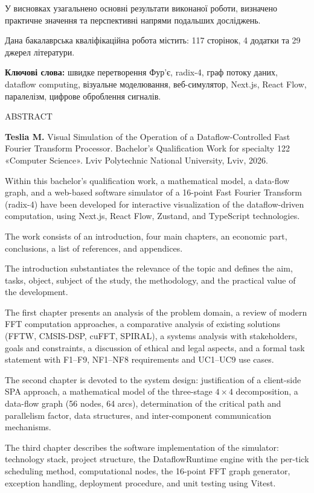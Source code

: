 \documentclass[
]{article}
\begin{document}
У висновках узагальнено основні результати виконаної роботи, визначено
практичне значення та перспективні напрями подальших досліджень.

Дана бакалаврська кваліфікаційна робота містить: 117 сторінок, 4 додатки
та 29 джерел літератури.

\textbf{Ключові слова:} швидке перетворення Фур'є, radix-4, граф потоку
даних, dataflow computing, візуальне моделювання, веб-симулятор,
Next.js, React Flow, паралелізм, цифрове оброблення сигналів.

ABSTRACT

\textbf{Teslia M.} Visual Simulation of the Operation of a
Dataflow-Controlled Fast Fourier Transform Processor. Bachelor's
Qualification Work for specialty 122 «Computer Science». Lviv
Polytechnic National University, Lviv, 2026.

Within this bachelor's qualification work, a mathematical model, a
data-flow graph, and a web-based software simulator of a 16-point Fast
Fourier Transform (radix-4) have been developed for interactive
visualization of the dataflow-driven computation, using Next.js, React
Flow, Zustand, and TypeScript technologies.

The work consists of an introduction, four main chapters, an economic
part, conclusions, a list of references, and appendices.

The introduction substantiates the relevance of the topic and defines
the aim, tasks, object, subject of the study, the methodology, and the
practical value of the development.

The first chapter presents an analysis of the problem domain, a review
of modern FFT computation approaches, a comparative analysis of existing
solutions (FFTW, CMSIS-DSP, cuFFT, SPIRAL), a systems analysis with
stakeholders, goals and constraints, a discussion of ethical and legal
aspects, and a formal task statement with F1--F9, NF1--NF8 requirements
and UC1--UC9 use cases.

The second chapter is devoted to the system design: justification of a
client-side SPA approach, a mathematical model of the three-stage
\(4 \times 4\) decomposition, a data-flow graph (56 nodes, 64 arcs),
determination of the critical path and parallelism factor, data
structures, and inter-component communication mechanisms.

The third chapter describes the software implementation of the
simulator: technology stack, project structure, the DataflowRuntime
engine with the per-tick scheduling method, computational nodes, the
16-point FFT graph generator, exception handling, deployment procedure,
and unit testing using Vitest.
\end{document}
